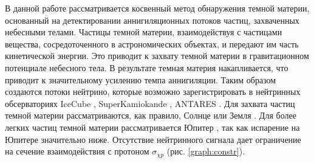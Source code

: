 В данной работе рассматривается косвенный метод обнаружения темной материи, основанный на детектировании аннигиляционных потоков частиц, захваченных небесными телами. Частицы темной материи, взаимодействуя с частицами вещества, сосредоточенного в астрономических объектах, и передают им часть кинетической энергии. Это приводит к захвату темной материи в гравитационном потенциале небесного тела. В результате темная материя накапливается, что приводит к значительному усилению темпа аннигиляции. Таким образом создаются потоки нейтрино, которые возможно зарегистрировать в нейтринных обсерваториях  IceCube \cite{Aartsen_2017}, SuperKamiokande \cite{kamiokandecollaboration2015search}, ANTARES \cite{ADRIANMARTINEZ201669}. Для захвата частиц темной материи рассматриваются, как правило, Солнце \cite{1985ApJ...296..679P} или Земля \cite{1987ApJ...321..571G}. Для более легких частиц темной материи рассматривается Юпитер \cite{French_2022}, так как испарение на Юпитере значительно ниже. Отсутствие нейтринного сигнала дает ограничение на сечение взаимодействия с протоном $\sigma_{\chi p}$ (рис. \ref{graph:constr}).

